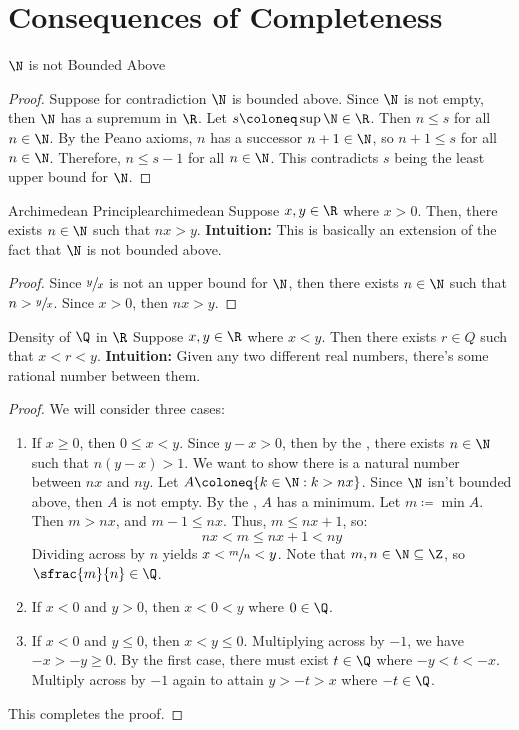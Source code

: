 \section{Consequences of Completeness}
\begin{thmbox}{$\N$ is not Bounded Above}{}
    \begin{proof}
        Suppose for contradiction $\N$ is bounded above. Since $\N$ is not empty, then $\N$ has a supremum in $\R$. Let $s \coloneq \sup \N \in \R$. Then $n \leq s$ for all $n \in \N$. By the Peano axioms, $n$ has a successor $n+1 \in \N$, so $n+1 \leq s$ for all $n \in \N$. Therefore, $n \leq s - 1$ for all $n \in \N$. This contradicts $s$ being the least upper bound for $\N$.
    \end{proof}
\end{thmbox}

\begin{thmbox}{Archimedean Principle}{archimedean}
    Suppose $x,y \in \R$ where $x > 0$. Then, there exists $n \in \N$ such that $nx > y$.
    \tcblower
    \textbf{Intuition:} This is basically an extension of the fact that $\N$ is not bounded above.
    \begin{proof}
        Since $\sfrac{y}{x}$ is not an upper bound for $\N$, then there exists $n \in \N$ such that $n > \sfrac{y}{x}$. Since $x > 0$, then $nx > y$.
    \end{proof}
\end{thmbox}

\begin{thmbox}{Density of $\Q$ in $\R$}{}
    Suppose $x,y \in \R$ where $x < y$. Then there exists $r \in Q$ such that $x < r < y$.
    \tcblower
    \textbf{Intuition:} Given any two different real numbers, there's some rational number between them.
    \begin{proof}
        We will consider three cases:
        \begin{enumerate}
            \item If $x \geq 0$, then $0 \leq x < y$. Since $y - x > 0$, then by the , there exists $n \in \N$ such that $n(y-x) > 1$. We want to show there is a natural number between $nx$ and $ny$. Let $A \coloneq \{ k \in \N : k > nx \}$. Since $\N$ isn't bounded above, then $A$ is not empty. By the , $A$ has a minimum. Let $m \coloneq \min A$. Then $m > nx$, and $m-1 \leq nx$. Thus, $m \leq nx+1$, so:
            \[ nx < m \leq nx+1 < ny \]
            Dividing across by $n$ yields $x < \sfrac{m}{n} < y$. Note that $m,n \in \N \subseteq \Z$, so $\sfrac{m}{n} \in \Q$.
            \item If $x < 0$ and $y > 0$, then $x < 0 < y$ where $0 \in \Q$.
            \item If $x < 0$ and $y \leq 0$, then $x < y \leq 0$. Multiplying across by $-1$, we have $-x > -y \geq 0$. By the first case, there must exist $t \in \Q$ where $-y < t < -x$. Multiply across by $-1$ again to attain $y > -t > x$ where $-t \in \Q$.
        \end{enumerate}
        This completes the proof.
    \end{proof}
\end{thmbox}

